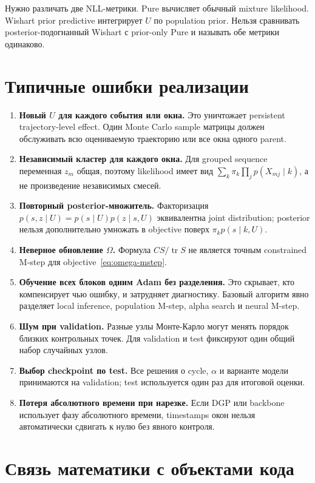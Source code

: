 \documentclass[12pt,a4paper]{article}
\DeclareMathOperator{\tr}{tr}
\newcommand{\term}[1]{\textbf{#1}}
\begin{document}
Нужно различать две NLL-метрики. Pure вычисляет обычный mixture likelihood. Wishart prior predictive интегрирует \(U\) по population prior. Нельзя сравнивать posterior-подогнанный Wishart с prior-only Pure и называть обе метрики одинаково.

\section{Типичные ошибки реализации}

\begin{enumerate}
\item \term{Новый \(U\) для каждого события или окна.} Это уничтожает persistent trajectory-level effect. Один Monte Carlo sample матрицы должен обслуживать всю оцениваемую траекторию или все окна одного parent.
\item \term{Независимый кластер для каждого окна.} Для grouped sequence переменная \(z_m\) общая, поэтому likelihood имеет вид \(\sum_k\pi_k\prod_jp(X_{mj}\mid k)\), а не произведение независимых смесей.
\item \term{Повторный posterior-множитель.} Факторизация \(p(s,z\mid U)=p(s\mid U)p(z\mid s,U)\) эквивалентна joint distribution; posterior нельзя дополнительно умножать в objective поверх \(\pi_kp(s\mid k,U)\).
\item \term{Неверное обновление \(\Omega\).} Формула \(CS/\tr S\) не является точным constrained M-step для objective~\eqref{eq:omega-mstep}.
\item \term{Обучение всех блоков одним Adam без разделения.} Это скрывает, кто компенсирует чью ошибку, и затрудняет диагностику. Базовый алгоритм явно разделяет local inference, population M-step, alpha search и neural M-step.
\item \term{Шум при validation.} Разные узлы Монте-Карло могут менять порядок близких контрольных точек. Для validation и test фиксируют один общий набор случайных узлов.
\item \term{Выбор checkpoint по test.} Все решения о cycle, \(\alpha\) и варианте модели принимаются на validation; test используется один раз для итоговой оценки.
\item \term{Потеря абсолютного времени при нарезке.} Если DGP или backbone использует фазу абсолютного времени, timestamps окон нельзя автоматически сдвигать к нулю без явного контроля.
\end{enumerate}

\section{Связь математики с объектами кода}
\end{document}
